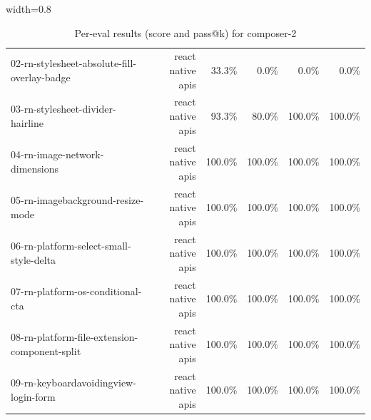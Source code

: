 \begin{table}[htbp]
\begin{adjustbox}{width=0.8\textwidth}
\begin{tabular}{lrrrrr}
02-rn-stylesheet-absolute-fill-overlay-badge & react native apis & 33.3\% & 0.0\% & 0.0\% & 0.0\% \\
03-rn-stylesheet-divider-hairline & react native apis & 93.3\% & 80.0\% & 100.0\% & 100.0\% \\
04-rn-image-network-dimensions & react native apis & 100.0\% & 100.0\% & 100.0\% & 100.0\% \\
05-rn-imagebackground-resize-mode & react native apis & 100.0\% & 100.0\% & 100.0\% & 100.0\% \\
06-rn-platform-select-small-style-delta & react native apis & 100.0\% & 100.0\% & 100.0\% & 100.0\% \\
07-rn-platform-os-conditional-cta & react native apis & 100.0\% & 100.0\% & 100.0\% & 100.0\% \\
08-rn-platform-file-extension-component-split & react native apis & 100.0\% & 100.0\% & 100.0\% & 100.0\% \\
09-rn-keyboardavoidingview-login-form & react native apis & 100.0\% & 100.0\% & 100.0\% & 100.0\% \\
\bottomrule
\end{tabular}
\end{adjustbox}
\caption{Per-eval results (score and pass@k) for composer-2}
\end{table}
